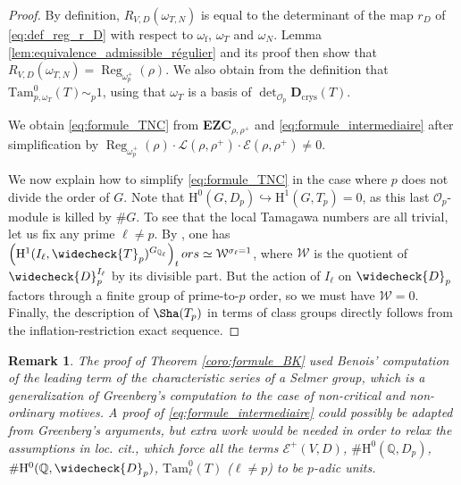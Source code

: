 \documentclass[12pt]{amsart}
\newcommand\bQ{\mathbb{Q}}
\newcommand\cE{\mathcal{E}}
\newcommand\cL{\mathcal{L}}
\newcommand\cO{\mathcal{O}}
\newcommand\cW{\mathcal{W}}
\DeclareMathOperator{\Reg}{Reg}
\newcommand{\HH}{\mathrm{H}}
\newcommand{\ff}{\mathrm{f}}
\newcommand{\crys}{\mathrm{crys}}
\theoremstyle{defstyle}
\newtheorem{remark}[subsubsection]{Remark}
\theoremstyle{thmstyle}
\begin{document}
\begin{proof}
	By definition, $R_{V,D}(\omega_{T,N})$ is equal to the determinant of the map $r_D$ of \eqref{eq:def_reg_r_D} with respect to $\omega_\ff$, $\omega_T$ and $\omega_N$. Lemma \ref{lem:equivalence_admissible_régulier} and its proof then show that $R_{V,D}(\omega_{T,N})= \Reg_{\omega_p^+}(\rho)$. We also obtain from the definition that $\textrm{Tam}^0_{p,\omega_T}(T)\sim_p 1$, using that $\omega_T$ is a basis of $\det_{\cO_p}\textbf{D}_\crys(T)$.
	 
	 We obtain \eqref{eq:formule_TNC} from \textbf{EZC}$_{\rho,\rho^+}$ and \eqref{eq:formule_intermediaire} after simplification by $\Reg_{\omega_p^+}(\rho)\cdot \cL(\rho,\rho^+)\cdot \cE(\rho,\rho^+)\neq 0$.
	
	We now explain how to simplify \eqref{eq:formule_TNC} in the case where $p$ does not divide the order of $G$. Note that $\HH^0(G,D_p) \hookrightarrow \HH^1(G,T_p)=0$, as this last $\cO_p$-module is killed by $\#G$. To see that the local Tamagawa numbers are all trivial, let us fix any prime $\ell\neq p$. By \cite[Lem. 3.2 (ii) and Lemma 3.5 (ii-iii)]{rubinES}, one has $\left(\HH^1(I_\ell,\widecheck{T}_p)^{G_{\bQ_\ell}}\right)_\textrm{tors}\simeq \cW^{\sigma_\ell=1}$, where $\cW$ is the quotient of $\widecheck{D}_p^{I_\ell}$ by its divisible part. But the action of $I_\ell$ on $\widecheck{D}_p$ factors through a finite group of prime-to-$p$ order, so we must have $\cW=0$. Finally, the description of $\Sha(T_p)$ in terms of class groups directly follows from the inflation-restriction exact sequence. 
\end{proof}
\begin{remark}
	The proof of Theorem \ref{coro:formule_BK} used Benois' computation of the leading term of the characteristic series of a Selmer group, which is a generalization of Greenberg's computation \cite[Prop. 4]{greenberg1994trivial} to the case of non-critical and non-ordinary motives. A proof of \eqref{eq:formule_intermediaire} could possibly be adapted from Greenberg's arguments, but extra work would be needed in order to relax the assumptions in \textit{loc. cit.}, which force all the terms $\cE^+(V,D)$, $\# \HH^0(\bQ,D_p)$, $\# \HH^0(\bQ,\widecheck{D}_p)$, $\textrm{Tam}^0_{\ell}(T)$ ($\ell \neq p$) to be $p$-adic units.
\end{remark}
\end{document}
